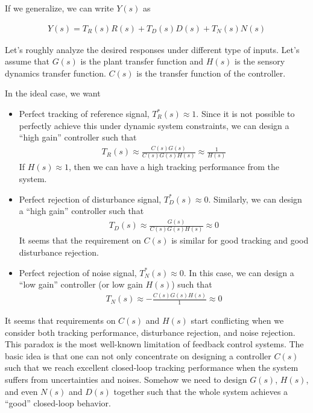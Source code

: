 \documentclass[twoside]{article}
\begin{document}
  If we generalize, we can write $Y(s)$ as 
  
  \begin{align*}
  Y(s) = T_R(s) R(s) + T_D(s) D(s) + T_N(s) N(s)
  \end{align*}
  
  Let's roughly analyze the desired responses under different type of inputs. 
  Let's assume that $G(s)$ is the plant transfer function and $H(s)$ is the sensory 
  dynamics transfer function. $C(s)$ is the 
  transfer function of the controller.
  
  In the ideal case, we want 
  \begin{itemize}
  	\item Perfect tracking of reference signal, $T^*_R(s) \approx 1 $. 
	Since it is not possible to perfectly achieve this under dynamic system constraints,
	we can design a ``high gain'' controller such that 
	  \begin{align*}
	  	T_R(s) \approx \frac{C(s) G(s)}{C(s) G(s) H(s)} \approx \frac{1}{H(s)}
	  \end{align*}
	  If $H(s) \approx 1$, then we can have a high tracking performance from the system. 
	  \item Perfect rejection of disturbance signal, $T^*_D(s) \approx 0 $. Similarly, 
	  we can design a ``high gain'' controller such that 
	  \begin{align*}
	  	T_D(s) \approx \frac{G(s)}{C(s) G(s) H(s)} \approx 0
	  \end{align*}
	  It seems that the requirement on $C(s)$ is similar for good tracking and
	  good disturbance rejection. 
	  \item Perfect rejection of noise signal, $T^*_N(s) \approx 0 $. In this case, we can design a 
	  ``low gain'' controller (or low gain $H(s)$) such that 
	  	  \begin{align*}
	  	T_N(s) \approx -\frac{C(s) G(s) H(s)}{1} \approx 0
	  \end{align*}
  \end{itemize}
  
It seems that requirements on $C(s)$ and $H(s)$ start conflicting when we consider both tracking performance, disturbance rejection, and noise rejection. This paradox is the most well-known limitation of feedback control systems. The basic idea is that one can not only concentrate on designing a controller $C(s)$ such that we reach excellent closed-loop tracking performance when the system suffers from uncertainties and noises. Somehow we need to design $G(s)$, $H(s)$, and even $N(s)$ and $D(s)$ together such that the whole system achieves a ``good'' closed-loop behavior. 
  
  
\end{document}
